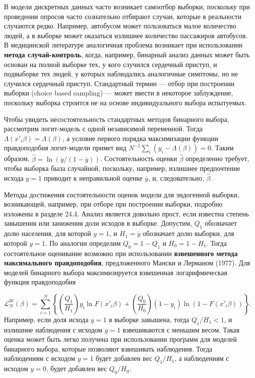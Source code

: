 В модели дискретных данных часто возникает самоотбор выборки,  поскольку при проведении опросов  часто сознательно отбирают случаи,  которые в реальности случаются редко. Например,  автобусом может пользоваться малое количество людей, а в выборке может оказаться  излишнее количество пассажиров автобусов. В медицинской литературе аналогичная проблема возникает при использовании \textbf{метода случай-контроль},  когда,  например,  бинарный анализ данных может быть основан на полной выборке тех,  у кого случился сердечный приступ,  и подвыборке тех людей,  у которых наблюдались аналогичные симптомы,  но не случился сердечный приступ. Стандартный термин --- отбор при построении выборки (choice based sampling) --- может ввести в некоторое заблуждение,  поскольку выборка строится не на основе индивидуального выбора испытуемых.

Чтобы увидеть несостоятельность стандартных методов бинарного выбора,  рассмотрим логит-модель с одной независимой переменной. Тогда $\Lambda (x'_i \beta) = \Lambda (\beta)$,  а условие первого порядка максимизации функции правдоподобия логит-модели примет вид $N^{-1}\sum_i (y_i-\Lambda (\beta)) = 0. $ Таким образом,  $\widehat\beta = \ln (\overline{y} / (1-\overline{y}))$. Состоятельность оценки $\widehat\beta$ определенно требует,  чтобы выборка была случайной,  поскольку,  например, излишнее предпочтение исхода $y=1$ приводит к неправильной оценке $\overline{y}$, и,  следовательно,  $\widehat\beta.$

Методы достижения состоятельности оценок модели для эндогенной выборки,  возникающей, например, при отборе при построении выборки,  подробно изложены в разделе 24.4. Анализ является довольно прост,  если известна степень завышения или занижения доли исходов в выборке. Допустим,  $Q_1$ обозначает долю населения,  для которой $y=1$,  и $H_1 = \overline{y}$ обозначает долю выборки,  для которой $y=1.$ По аналогии определим $Q_0 = 1-Q_1$ и $H_0 = 1-H_1.$ Тогда состоятельное оценивание возможно при использовании \textbf{взвешенного метода максимального правдоподобия},  предложенного Мански и Лерманом  (1977). Для моделей бинарного выбора максимизируется взвешенная логарифмическая функция правдоподобия 

\[
\mathcal{L}^W_N (\beta) = \sum^N_{i=1} \left\{ \left(\frac{Q_1}{H_1}\right)y_i \ln F(x'_i\beta) + \left(\frac{Q_0}{H_0}\right) (1-y_i) \ln (1-F(x'_i\beta)) \right\}.
\] 
Например,  если доля исхода $y=1$ в выборке завышена,  тогда $Q_1/H_1 < 1$,  и излишние наблюдения с исходом $y=1$ взвешиваются с меньшим весом. Такая оценка может быть легко получена при использовании программ для моделей бинарного выбора,  которые позволяют взвешивать наблюдения. Тогда наблюдениям с исходом $y=1$ будет добавлен вес $Q_1/H_1$,  а  наблюдениям с исходом $y=0$, будет добавлен вес $Q_0/H_0.$

